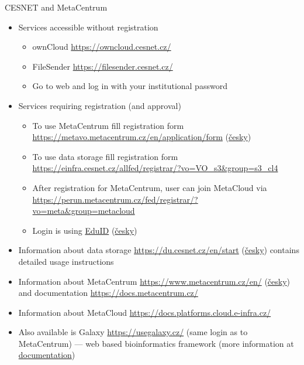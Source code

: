 \documentclass[compress, xelatex, 11pt, xcolor=svgnames, aspectratio=169, url={hyphens, lowtilde}]{beamer}
\begin{document}
\begin{frame}[allowframebreaks]{CESNET and MetaCentrum}
\begin{itemize}
\begin{itemize}
			\begin{itemize}
				\item It is possible to connect by webDAV to ownCloud (slide \ref{transfers}) --- many applications support it
				\item It is possible to share calendars and/or address books via calDav and cardDav among devices and/or people
			\end{itemize}
		\end{itemize}
		\item Services accessible without registration
		\begin{itemize}
			\item ownCloud \url{https://owncloud.cesnet.cz/}
			\item FileSender \url{https://filesender.cesnet.cz/}
			\item Go to web and log in with your institutional password
		\end{itemize}
		\item Services requiring registration (and approval)
		\begin{itemize}
			\item To use MetaCentrum fill registration form \url{https://metavo.metacentrum.cz/en/application/form} (\href{https://metavo.metacentrum.cz/cs/application/}{česky})
			\item To use data storage fill registration form \url{https://einfra.cesnet.cz/allfed/registrar/?vo=VO_s3&group=s3_cl4}
			\item After registration for MetaCentrum, user can join MetaCloud via \url{https://perun.metacentrum.cz/fed/registrar/?vo=meta&group=metacloud}
			\item Login is using \href{https://www.eduid.cz/en/index}{EduID} (\href{https://www.eduid.cz/cs/index}{česky})
		\end{itemize}
		\item Information about data storage \url{https://du.cesnet.cz/en/start} (\href{https://du.cesnet.cz/cs/start}{česky}) contains detailed usage instructions
		\item Information about MetaCentrum \url{https://www.metacentrum.cz/en/} (\href{https://www.metacentrum.cz/cs/}{česky}) and documentation \url{https://docs.metacentrum.cz/}
		\item Information about MetaCloud \url{https://docs.platforms.cloud.e-infra.cz/}
		\item Also available is Galaxy \url{https://usegalaxy.cz/} (same login as to MetaCentrum) --- web based bioinformatics framework (more information at \href{https://docs.metacentrum.cz/en/docs/related/galaxy}{documentation})

\end{itemize}
\end{frame}
\end{document}
